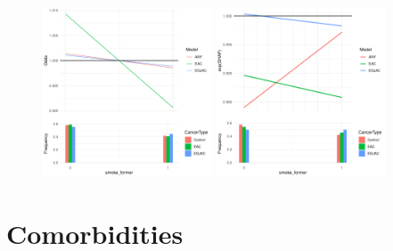 \documentclass[12pt]{article}
\begin{document}
\begin{figure}[h]
\centering
\includegraphics[width=0.45\textwidth]{pdp/smoke_former.pdf}
\includegraphics[width=0.45\textwidth]{shap/smoke_former.pdf}
\end{figure}



\newpage
\clearpage
\section{Comorbidities}
\end{document}

